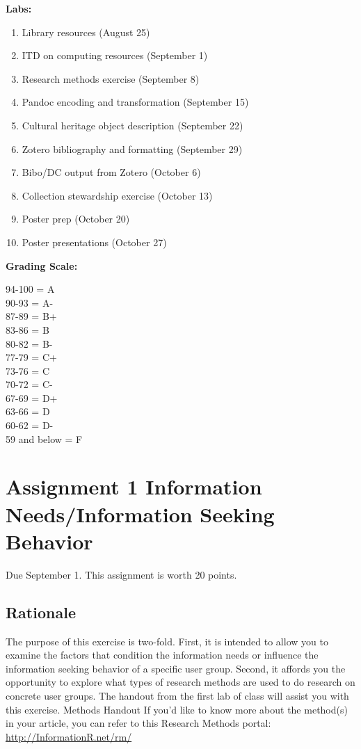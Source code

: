 \documentclass[]{article}
\providecommand{\tightlist}{%
  \setlength{\itemsep}{0pt}\setlength{\parskip}{0pt}}
\begin{document}
\textbf{Labs:}

\begin{enumerate}
\def\labelenumi{\arabic{enumi}.}
\tightlist
\item
  Library resources (August 25)
\item
  ITD on computing resources (September 1)
\item
  Research methods exercise (September 8)
\item
  Pandoc encoding and transformation (September 15)
\item
  Cultural heritage object description (September 22)
\item
  Zotero bibliography and formatting (September 29)
\item
  Bibo/DC output from Zotero (October 6)
\item
  Collection stewardship exercise (October 13)
\item
  Poster prep (October 20)
\item
  Poster presentations (October 27)
\end{enumerate}

\textbf{Grading Scale:}

94-100 = A\\
90-93 = A-\\
87-89 = B+\\
83-86 = B\\
80-82 = B-\\
77-79 = C+\\
73-76 = C\\
70-72 = C-\\
67-69 = D+\\
63-66 = D\\
60-62 = D-\\
59 and below = F

\section{Assignment 1 Information Needs/Information Seeking
Behavior}\label{Asgt1}

Due September 1. This assignment is worth 20 points.

\subsection{Rationale}\label{rationale}

The purpose of this exercise is two-fold. First, it is intended to allow
you to examine the factors that condition the information needs or
influence the information seeking behavior of a specific user group.
Second, it affords you the opportunity to explore what types of research
methods are used to do research on concrete user groups. The handout
from the first lab of class will assist you with this exercise. Methods
Handout If you'd like to know more about the method(s) in your article,
you can refer to this Research Methods portal:
\url{http://InformationR.net/rm/}
\end{document}
